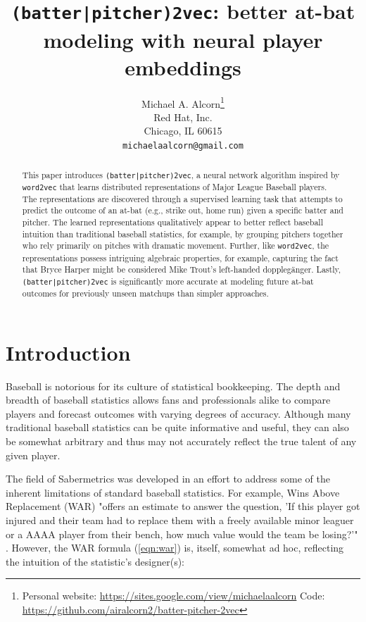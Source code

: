 \documentclass{article}
\title{\texttt{(batter|pitcher)2vec}: better at-bat modeling with neural player embeddings}
\date{}
\author{
    Michael A. Alcorn\thanks
    {Personal website: \url{https://sites.google.com/view/michaelaalcorn}\newline
    \hspace*{1.8em}Code: \url{https://github.com/airalcorn2/batter-pitcher-2vec}} \\
    Red Hat, Inc.\\
    Chicago, IL 60615 \\
    \texttt{michaelaalcorn@gmail.com} \\
}
\begin{document}
\maketitle

\begin{abstract}

This paper introduces \texttt{(batter|pitcher)2vec}, a neural network algorithm inspired by \texttt{word2vec} that learns distributed representations of Major League Baseball players. The representations are discovered through a supervised learning task that attempts to predict the outcome of an at-bat (e.g., strike out, home run) given a specific batter and pitcher. The learned representations qualitatively appear to better reflect baseball intuition than traditional baseball statistics, for example, by grouping pitchers together who rely primarily on pitches with dramatic movement. Further, like \texttt{word2vec}, the representations possess intriguing algebraic properties, for example, capturing the fact that Bryce Harper might be considered Mike Trout's left-handed dopplegänger. Lastly, \texttt{(batter|pitcher)2vec} is significantly more accurate at modeling future at-bat outcomes for previously unseen matchups than simpler approaches.

\end{abstract}

\section{Introduction}

Baseball is notorious for its culture of statistical bookkeeping. The depth and breadth of baseball statistics allows fans and professionals alike to compare players and forecast outcomes with varying degrees of accuracy. Although many traditional baseball statistics can be quite informative and useful, they can also be somewhat arbitrary and thus may not accurately reflect the true talent of any given player.

The field of Sabermetrics was developed in an effort to address some of the inherent limitations of standard baseball statistics. For example, Wins Above Replacement (WAR) "offers an estimate to answer the question, 'If this player got injured and their team had to replace them with a freely available minor leaguer or a AAAA player from their bench, how much value would the team be losing?'" \parencite{WAR}. However, the WAR formula (\ref{eqn:war}) is, itself, somewhat ad hoc, reflecting the intuition of the statistic's designer(s):
\end{document}
